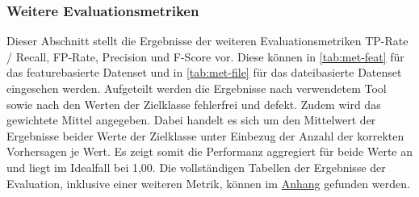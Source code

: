 \subsubsection*{Weitere Evaluationsmetriken}

Dieser Abschnitt stellt die Ergebnisse der weiteren Evaluationsmetriken TP-Rate / Recall, FP-Rate, Precision und F-Score vor. Diese können in \autoref{tab:met-feat} für das featurebasierte Datenset und in \autoref{tab:met-file} für das dateibasierte Datenset eingesehen werden. Aufgeteilt werden die Ergebnisse nach verwendetem Tool sowie nach den Werten der Zielklasse \glqq fehlerfrei\grqq{} und \glqq defekt\grqq. Zudem wird das gewichtete Mittel angegeben. Dabei handelt es sich um den Mittelwert der Ergebnisse beider Werte der Zielklasse unter Einbezug der Anzahl der korrekten Vorhersagen je Wert. Es zeigt somit die Performanz aggregiert für beide Werte an und liegt im Idealfall bei 1,00. Die vollständigen Tabellen der Ergebnisse der Evaluation, inklusive einer weiteren Metrik, können im \hyperref[appendix3]{Anhang} gefunden werden.

